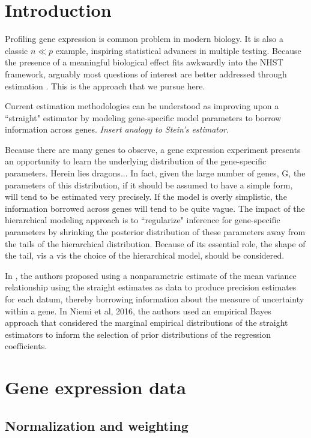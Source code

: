 
\section{Introduction}
Profiling gene expression is common problem in modern biology. It is also a classic $n \ll p$ example, inspiring statistical advances in multiple testing. Because the presence of a meaningful biological effect fits awkwardly into the NHST framework, arguably most questions of interest are better addressed through estimation \citet{deseq2014}. This is the approach that we pursue here.

Current estimation methodologies can be understood as improving upon a ``straight" estimator by modeling gene-specific model parameters to borrow information across genes. \textit{Insert analogy to Stein's estimator}.

Because there are many genes to observe, a gene expression experiment presents an opportunity to learn the underlying distribution of the gene-specific parameters. Herein lies dragons... In fact, given the large number of genes, G, the parameters of this distribution, if it should be assumed to have a simple form, will tend to be estimated very precisely. If the model is overly simplistic, the information borrowed across genes will tend to be quite vague. The impact of the hierarchical modeling approach is to ``regularize" inference for gene-specific parameters by shrinking the posterior distribution of these parameters away from the tails of the hierarchical distribution. Because of its essential role, the shape of the tail, vis a vis the choice of the hierarchical model, should be considered.

In \citet{voom}, the authors proposed using a nonparametric estimate of the mean variance relationship using the straight estimates as data to produce precision estimates for each datum, thereby borrowing information about the measure of uncertainty within a gene. In Niemi et al, 2016, the authors used an empirical Bayes approach that considered the marginal empirical distributions of the straight estimators to inform the selection of prior distributions of the regression coefficients.

\citet{liu}

\section{Gene expression data}
\subsection{Normalization and weighting}
